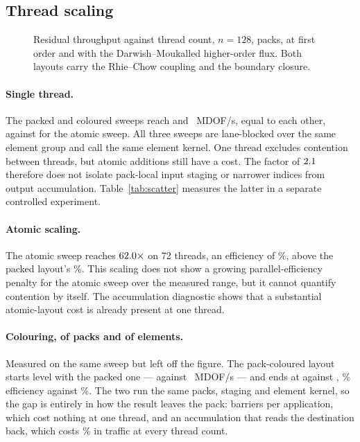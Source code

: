 \documentclass[sigconf,nonacm]{acmart}
\begin{document}
\subsection{Thread scaling}
\label{sec:res:scaling}

\begin{figure}[t]
  \centering
  
  \caption{Residual throughput against thread count, $n=128$, \scalePacks{} packs, at first
    order and with the Darwish--Moukalled higher-order flux. Both layouts carry the Rhie--Chow
    coupling and the boundary closure.}
  \label{fig:scaling}
\end{figure}

\paragraph{Single thread.} The packed and coloured sweeps reach \scalePackedResOne{} and
\scaleColoredResOne{}~MDOF/s, equal to each other, against \scaleAtomicResOne{} for the atomic
sweep. All three sweeps are lane-blocked over the same element group and call the same
element kernel. One thread excludes contention between threads, but atomic additions
still have a cost. The factor of $2.1$ therefore does not isolate
pack-local input staging or narrower indices from output accumulation.
Table~\ref{tab:scatter} measures the latter in a separate controlled experiment.

\paragraph{Atomic scaling.} The atomic sweep reaches $62.0\times$ on 72 threads,
an efficiency of \scaleAtomicResEff\%, above the packed layout's \scalePackedResEff\%.
This scaling does not show a growing parallel-efficiency penalty for the atomic sweep
over the measured range, but it cannot quantify contention by itself. The accumulation
diagnostic shows that a substantial atomic-layout cost is already present at one thread.

\paragraph{Colouring, of packs and of elements.} Measured on the same sweep but left off the
figure. The pack-coloured layout starts level with the packed one --- \scaleColoredResOne{}
against \scalePackedResOne{}~MDOF/s --- and ends at \scaleColoredResTop{} against
\scalePackedResTop{}, \scaleColoredResEff\% efficiency against \scalePackedResEff\%. The two run
the same packs, staging and element kernel, so the gap is entirely in how the result leaves the
pack: \campNColors{} barriers per application, which cost nothing at one thread, and an
accumulation that reads the destination back, which costs \colBytesPctResRc\% in traffic at every
thread count.
\end{document}
